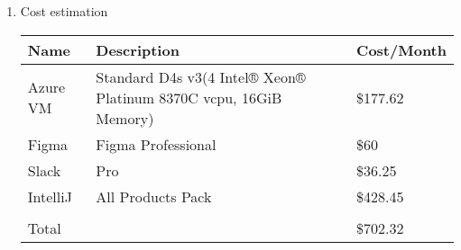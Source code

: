 \begin{enumerate}[label=\arabic*]
    \item Cost estimation
          \begin{table}[H]
              \center
              \begin{tabular}{m{1.4cm} m{4.1cm} m{1.4cm}}
                  \toprule
                  Name     & Description                                                       & Cost/Month \\
                  \midrule
                  Azure VM & Standard D4s v3(4 Intel® Xeon® Platinum 8370C vcpu, 16GiB Memory) & \$177.62   \\
                  Figma    & Figma Professional                                                & \$60       \\
                  Slack    & Pro                                                               & \$36.25    \\
                  IntelliJ & All Products Pack                                                 & \$428.45   \\
                  \bottomrule                                                                               \\
                  Total    &                                                                   & \$702.32   \\
              \end{tabular}
          \end{table}
\end{enumerate}
